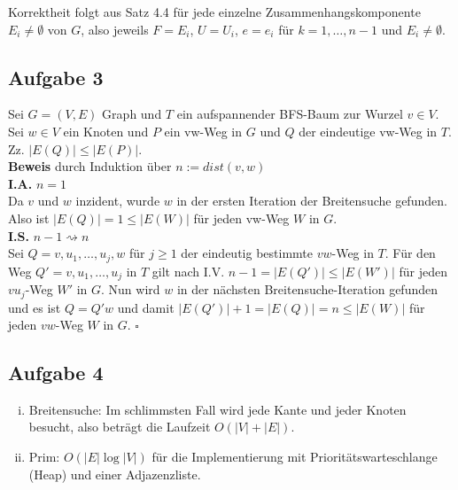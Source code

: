 \documentclass[11pt,a4paper,ngerman]{article}
\begin{document}
Korrektheit folgt aus Satz 4.4 für jede einzelne Zusammenhangskomponente $E_i \neq \emptyset$ von $G$, also jeweils $F = E_i$, $U = U_i$, $e = e_i$ für $k = 1,\ldots,n-1$ und $E_i \neq \emptyset$.
\subsection*{Aufgabe 3}
Sei $G = (V,E)$ Graph und $T$ ein aufspannender BFS-Baum zur Wurzel $v \in V$. Sei $w \in V$ ein Knoten und $P$ ein vw-Weg in $G$ und $Q$ der eindeutige vw-Weg in $T$. Zz. $|E(Q)| \leq |E(P)|$. \\

\textbf{Beweis} durch Induktion über $n := dist(v,w)$ \\
\textbf{I.A.} $n = 1$ \\
Da $v$ und $w$ inzident, wurde $w$ in der ersten Iteration der Breitensuche gefunden. Also ist $|E(Q)| = 1 \leq |E(W)|$ für jeden vw-Weg $W$ in $G$. \\

\textbf{I.S.} $n-1 \rightsquigarrow n$ \\
Sei $Q = v,u_1,\ldots,u_j,w$ für $j \geq 1$ der eindeutig bestimmte $vw$-Weg in $T$.
Für den Weg $Q' = v,u_1,\ldots,u_j$ in $T$ gilt nach I.V. $n-1 = |E(Q')| \leq |E(W')|$ für jeden $vu_j$-Weg $W'$ in $G$.
Nun wird $w$ in der nächsten Breitensuche-Iteration gefunden und es ist $Q = Q'w$ und damit $|E(Q')|+1 =|E(Q)| = n  \leq |E(W)|$ für jeden $vw$-Weg $W$ in $G$.
\mbox{} \hfill $\square$
\subsection*{Aufgabe 4}
\begin{enumerate}[i)]
\item Breitensuche: Im schlimmsten Fall wird jede Kante und jeder Knoten besucht, also beträgt die Laufzeit $O(|V| + |E|)$.
\item Prim: $O(|E| \log |V|)$ für die Implementierung mit Prioritätswarteschlange (Heap) und einer Adjazenzliste.
\end{enumerate}

\label{LastPage}
\end{document}
